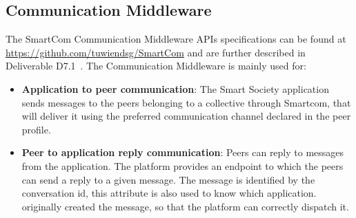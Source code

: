 \subsection{Communication Middleware}
The SmartCom Communication Middleware APIs specifications can be found at 
\url{https://github.com/tuwiendsg/SmartCom} and are further described in Deliverable D7.1~\cite{D7.1}. The Communication Middleware is mainly used for:
\begin{itemize}
\item {\bf Application to peer communication}: The Smart Society application sends messages to the peers belonging to a collective through Smartcom, that will deliver it using the preferred communication channel declared in the peer profile.
\item {\bf Peer to application reply communication}: Peers can reply to messages from the application. The platform provides an endpoint to which the peers can send a reply to a given message. The message is identified by the conversation id, this attribute is also used to know which application.
originally created the message, so that the platform can correctly dispatch it. 
\end{itemize}

